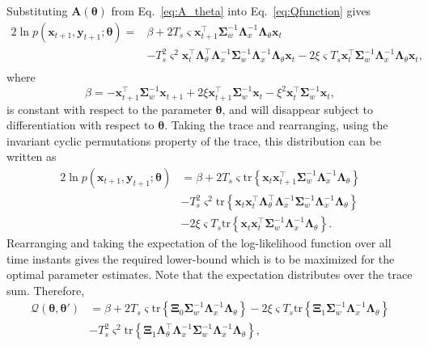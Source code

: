 \documentclass[review,authoryear,3p]{elsarticle}
\begin{document}
Substituting $\mathbf A( \boldsymbol\theta)$ from Eq.~\eqref{eq:A_theta} into Eq.~\eqref{eq:Qfunction} gives
\begin{align}
2\ln p(\mathbf x_{t+1}, \mathbf y_{t+1};\boldsymbol\theta)=&\beta+2 T_s\varsigma\mathbf x_{t+1}^\top\boldsymbol\Sigma_w^{-1}\boldsymbol\Lambda_x^{-1}\boldsymbol\Lambda_{\theta}\mathbf x_t \nonumber \\
&-T_s^2\varsigma^2\mathbf x_t^\top \boldsymbol\Lambda_{\theta}^\top\boldsymbol\Lambda_x^{-1}\boldsymbol\Sigma_w^{-1}\boldsymbol\Lambda_x^{-1}\boldsymbol\Lambda_{\theta}\mathbf x_t-2\xi \varsigma T_s\mathbf x_t^\top\boldsymbol\Sigma_w^{-1}\boldsymbol\Lambda_x^{-1}\boldsymbol\Lambda_{\theta}\mathbf x_t,\nonumber \\
\end{align}
where 
\begin{equation}
\beta=-\mathbf x_{t+1}^\top\boldsymbol\Sigma_w^{-1}\mathbf x_{t+1}+2\xi\mathbf x_{t+1}^\top\boldsymbol\Sigma_w^{-1}\mathbf x_t-\xi^2\mathbf x_t^\top\boldsymbol\Sigma_w^{-1}\mathbf x_t,
\end{equation}
is constant with respect to the parameter $\boldsymbol\theta$, and will disappear subject to differentiation with respect to $\boldsymbol\theta$. Taking the trace and rearranging, using the invariant cyclic permutations property of the trace, this distribution can be written as
\begin{align}\label{eq:Qfunctionintrace}
2\ln p(\mathbf x_{t+1}, \mathbf y_{t+1};\boldsymbol\theta)&=\beta+2 T_s\varsigma\mathrm{tr} \left\lbrace \mathbf x_t\mathbf x_{t+1}^\top\boldsymbol\Sigma_w^{-1}\boldsymbol\Lambda_x^{-1}\boldsymbol\Lambda_{\theta}\right\rbrace \nonumber \\
&-T_s^2\varsigma^2\mathrm{tr} \left\lbrace \mathbf x_t\mathbf x_t^\top \boldsymbol\Lambda_{\theta}^\top\boldsymbol\Lambda_x^{-1}\boldsymbol\Sigma_w^{-1}\boldsymbol\Lambda_x^{-1}\boldsymbol\Lambda_{\theta}\right\rbrace\nonumber \\
&-2\xi\varsigma T_s\mathrm{tr} \left\lbrace \mathbf x_t\mathbf x_{t}^\top\boldsymbol\Sigma_w^{-1}\boldsymbol\Lambda_x^{-1}\boldsymbol\Lambda_{\theta}\right\rbrace.
\end{align}
Rearranging and taking the expectation of the log-likelihood function over all time instants gives the required lower-bound which is to be maximized for the optimal parameter estimates. Note that the expectation distributes over the trace sum. Therefore, 
\begin{align}\label{eq:MRA-QintermsofTraces}
\mathcal Q(\boldsymbol \theta, \boldsymbol\theta')&=\beta+2 T_s\varsigma\mathrm{tr} \left\lbrace \boldsymbol \Xi_0\boldsymbol\Sigma_w^{-1}\boldsymbol\Lambda_x^{-1}\boldsymbol\Lambda_{\theta}\right\rbrace-2\xi\varsigma T_s\mathrm{tr} \left\lbrace \boldsymbol\Xi_1\boldsymbol\Sigma_w^{-1}\boldsymbol\Lambda_x^{-1}\boldsymbol\Lambda_{\theta}\right\rbrace \nonumber \\
&-T_s^2\varsigma^2\mathrm{tr} \left\lbrace \boldsymbol\Xi_1 \boldsymbol\Lambda_{\theta}^\top\boldsymbol\Lambda_x^{-1}\boldsymbol\Sigma_w^{-1}\boldsymbol\Lambda_x^{-1}\boldsymbol\Lambda_{\theta}\right\rbrace,
\end{align}
\end{document}
